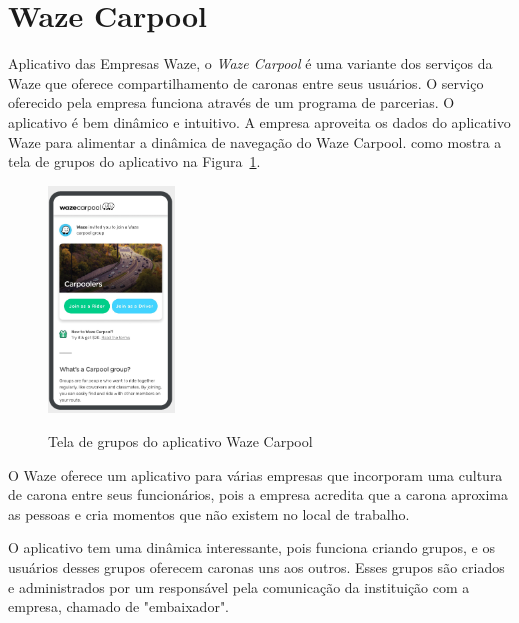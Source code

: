 \section{Waze Carpool}
Aplicativo das Empresas Waze, o \textit{Waze Carpool} é uma variante dos serviços da Waze que oferece compartilhamento de caronas entre seus usuários. O serviço oferecido pela empresa funciona através de um programa de parcerias. O aplicativo é bem dinâmico e intuitivo. A empresa aproveita os dados do aplicativo Waze para alimentar a dinâmica de navegação do Waze Carpool. como mostra a tela de grupos do aplicativo na Figura~\ref{fig:tela_grupos_wazecarpool}.

\begin{figure}[!hbtp]
	\centering
	\caption{Tela de grupos do aplicativo Waze Carpool}
	\includegraphics[width=0.3\textwidth]{./04-figuras/waze/Tela_de_grupos.png}
	\label{fig:tela_grupos_wazecarpool}
\end{figure}

O Waze oferece um aplicativo para várias empresas que incorporam uma cultura de carona entre seus funcionários, pois a empresa acredita que a carona aproxima as pessoas e cria momentos que não existem no local de trabalho.

O aplicativo tem uma dinâmica interessante, pois funciona criando grupos, e os usuários desses grupos oferecem caronas uns aos outros. %
Esses grupos são criados e administrados por um responsável pela comunicação da instituição com a empresa, chamado de "embaixador".



